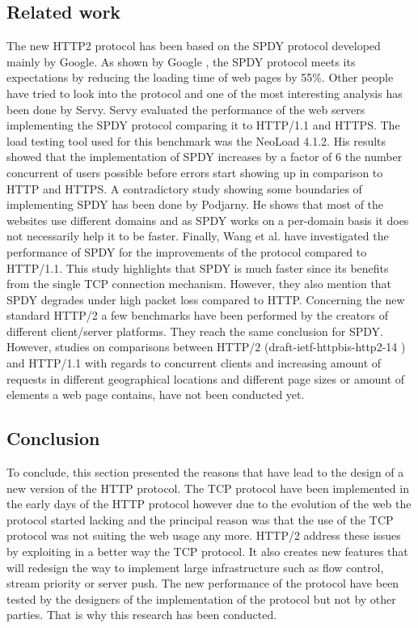 \subsection{Related work}
The new HTTP2 protocol has been based on the SPDY protocol developed mainly by Google. As shown by Google \cite{google2x}, the SPDY protocol meets its expectations by reducing the loading time of web pages by 55\%. Other people have tried to look into the protocol and one of the most interesting analysis has been done by Servy\cite{servy}. Servy evaluated the performance of the web servers implementing the SPDY protocol comparing it to HTTP/1.1 and HTTPS. The load testing tool used for this benchmark was the NeoLoad 4.1.2. His results showed that the implementation of SPDY increases by a factor of 6 the number concurrent of users possible before errors start showing up in comparison to HTTP and HTTPS. 
A contradictory study showing some boundaries of implementing SPDY has been done by Podjarny\cite{podiatry}. He shows that most of the websites use different domains and as SPDY works on a per-domain basis it does not necessarily help it to be faster. Finally, Wang et al.\cite{wang} have investigated the performance of SPDY for the improvements of the protocol compared to HTTP/1.1. This study highlights that SPDY is much faster since its benefits from the single TCP connection mechanism. However, they also mention that SPDY degrades under high packet loss compared to HTTP. 
Concerning the new standard HTTP/2 a few benchmarks have been performed by the creators of different client/server platforms. They reach the same conclusion for SPDY. \\
However, studies on comparisons between HTTP/2 (draft-ietf-httpbis-http2-14 \cite{h2c-14} ) and HTTP/1.1 with regards to concurrent clients and increasing amount of requests in different geographical locations and different page sizes or amount of elements a web page contains, have not been conducted yet.

\subsection{Conclusion}
To conclude, this section presented the reasons that have lead to the design of a new version of the HTTP protocol. The TCP protocol have been implemented in the early days of the HTTP protocol however due to the evolution of the web the protocol started lacking and the principal reason was that the use of the TCP protocol was not suiting the web usage any more. HTTP/2 address these issues by exploiting in a better way the TCP protocol. It also creates new features that will redesign the way to implement large infrastructure such as flow control, stream priority or server push. The new performance of the protocol have been tested by the designers of the implementation of the protocol but not by other parties. That is why this research has been conducted.